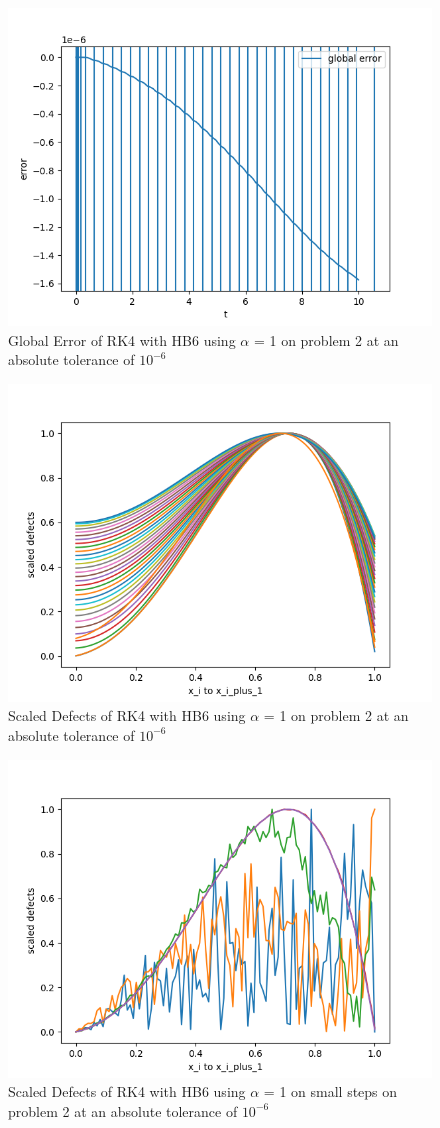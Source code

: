 \documentclass{article}
\begin{document}
\begin{figure}[H]
\centering
\includegraphics[width=0.7\linewidth]{./figures/static_alpha_rk4_with_hb6_p2_global_error}
\caption{Global Error of RK4 with HB6 using $\alpha$ = 1 on problem 2 at an absolute tolerance of $10^{-6}$}
\label{fig:static_alpha_rk4_with_hb6_p2_global_error}
\end{figure}

\begin{figure}[H]
\centering
\includegraphics[width=0.7\linewidth]{./figures/static_alpha_rk4_with_hb6_p2_scaled_defects}
\caption{Scaled Defects of RK4 with HB6 using $\alpha$ = 1 on problem 2 at an absolute tolerance of $10^{-6}$}
\label{fig:static_alpha_rk4_with_hb6_p2_scaled_defects}
\end{figure}

\begin{figure}[H]
\centering
\includegraphics[width=0.7\linewidth]{./figures/static_alpha_rk4_with_hb6_p2_scaled_defects_small_steps}
\caption{Scaled Defects of RK4 with HB6 using $\alpha$ = 1 on small steps on problem 2 at an absolute tolerance of $10^{-6}$}
\label{fig:static_alpha_rk4_with_hb6_p2_scaled_defects_small_steps}
\end{figure}
\end{document}
